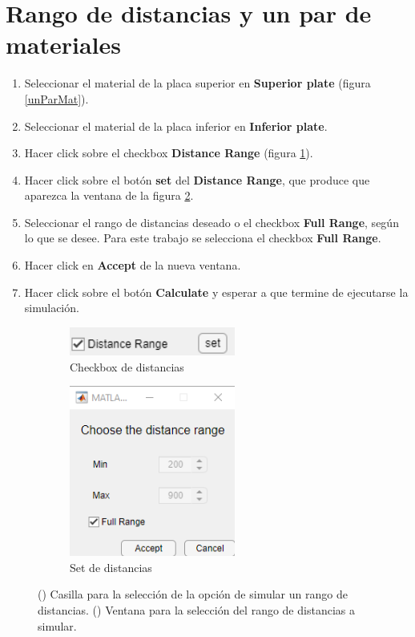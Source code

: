 \section{Rango de distancias y un par de materiales}
\begin{enumerate}
	\item Seleccionar el material de la placa superior en \textbf{Superior plate} (figura \ref{unParMat}).
	\item Seleccionar el material de la placa inferior en \textbf{Inferior plate}.
	\item Hacer click sobre el checkbox \textbf{Distance Range} (figura \ref{fig:check_distances2}).
	\item Hacer click sobre el botón \textbf{set} del \textbf{Distance Range}, que produce que aparezca la ventana de la figura \ref{fig:set_distances2}.
	\item Seleccionar el rango de distancias deseado o el checkbox \textbf{Full Range}, según lo que se desee. Para este trabajo se selecciona el checkbox \textbf{Full Range}.
	\item Hacer click en \textbf{Accept} de la nueva ventana.
	\item Hacer click sobre el botón \textbf{Calculate} y esperar a que termine de ejecutarse la simulación.
\end{enumerate}
	\begin{figure}[H]%
	\begin{subfigure}[b]{0.48\textwidth}
		\centering
			\includegraphics[width=0.6\textwidth]{figuras/Procedimiento_Simulaciones/Radiacion/check_distances2.png}
		\caption{Checkbox de distancias}
		\label{fig:check_distances2}
	\end{subfigure}
	\hfill
	\begin{subfigure}[b]{0.48\textwidth}
		\centering
			\includegraphics[width=0.6\textwidth]{figuras/Procedimiento_Simulaciones/Radiacion/set_distances_fullrange.png}
		\caption{Set de distancias}
		\label{fig:set_distances2}
	\end{subfigure}
	\caption{() Casilla para la selección de la opción de simular un rango de distancias. () Ventana para la selección del rango de distancias a simular.}%
	\label{fig:checkboxes2}%
	\end{figure}
